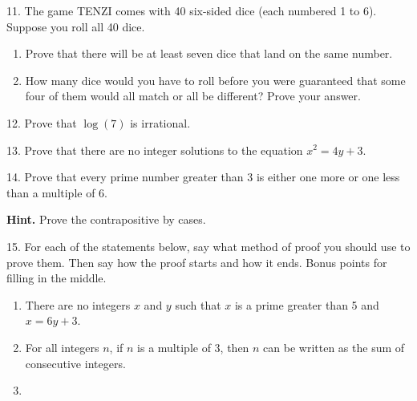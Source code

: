 \documentclass[12pt,]{book}
\theoremstyle{plain}
\theoremstyle{definition}
\theoremstyle{definition}
\theoremstyle{definition}
\numberwithin{equation}{chapter}
\begin{document}
\begin{exerciselist}
\par\smallskip
\item[11.]\hypertarget{exercise-167}{}\hypertarget{p-1458}{}%
The game TENZI comes with 40 six-sided dice (each numbered 1 to 6). Suppose you roll all 40 dice. \leavevmode%
\begin{enumerate}[label=(\alph*)]
\item\hypertarget{li-682}{}Prove that there will be at least seven dice that land on the same number.%
\item\hypertarget{li-683}{}\hypertarget{p-1459}{}%
How many dice would you have to roll before you were guaranteed that some four of them would all match or all be different? Prove your answer.%
\end{enumerate}
%
\par\smallskip
\item[12.]\hypertarget{exercise-168}{}\hypertarget{p-1465}{}%
Prove that \(\log(7)\) is irrational.%
\par\smallskip
\item[13.]\hypertarget{exercise-169}{}\hypertarget{p-1470}{}%
Prove that there are no integer solutions to the equation \(x^2 = 4y + 3\).%
\par\smallskip
\item[14.]\hypertarget{exercise-170}{}\hypertarget{p-1471}{}%
Prove that every prime number greater than 3 is either one more or one less than a multiple of 6.%
\par\smallskip
\par\smallskip%
\noindent\textbf{Hint.}\hypertarget{hint-11}{}\quad%
\hypertarget{p-1472}{}%
Prove the contrapositive by cases.%
\item[15.]\hypertarget{exercise-171}{}\hypertarget{p-1473}{}%
For each of the statements below, say what method of proof you should use to prove them. Then say how the proof starts and how it ends. Bonus points for filling in the middle.%
\par
\hypertarget{p-1474}{}%
\leavevmode%
\begin{enumerate}[label=(\alph*)]
\item\hypertarget{li-686}{}\hypertarget{p-1475}{}%
There are no integers \(x\) and \(y\) such that \(x\) is a prime greater than 5 and \(x = 6y + 3\).%
\item\hypertarget{li-687}{}\hypertarget{p-1476}{}%
For all integers \(n\), if \(n\) is a multiple of 3, then \(n\) can be written as the sum of consecutive integers.%
\item\hypertarget{li-688}{}\hypertarget{p-1477}{}%

\end{enumerate}
\end{exerciselist}
\end{document}
